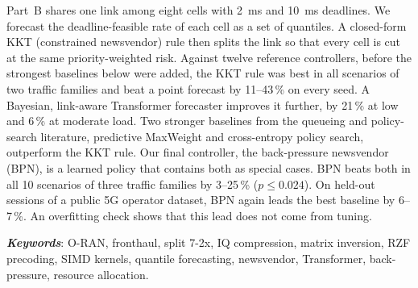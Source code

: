 \documentclass[12pt,a4paper,oneside]{report}
\theoremstyle{definition}
\begin{document}
Part~B shares one link among eight cells with 2~ms and 10~ms deadlines. We forecast the deadline-feasible rate of each cell as a set of quantiles. A closed-form KKT (constrained newsvendor) rule then splits the link so that every cell is cut at the same priority-weighted risk. Against twelve reference controllers, before the strongest baselines below were added, the KKT rule was best in all scenarios of two traffic families and beat a point forecast by 11--43\,\% on every seed. A Bayesian, link-aware Transformer forecaster improves it further, by 21\,\% at low and 6\,\% at moderate load. Two stronger baselines from the queueing and policy-search literature, predictive MaxWeight and cross-entropy policy search, outperform the KKT rule. Our final controller, the back-pressure newsvendor (BPN), is a learned policy that contains both as special cases. BPN beats both in all 10 scenarios of three traffic families by 3--25\,\% ($p \le 0.024$). On held-out sessions of a public 5G operator dataset, BPN again leads the best baseline by 6--7\,\%. An overfitting check shows that this lead does not come from tuning.

\vspace{2mm}
\noindent\textbf{\emph{Keywords}}: O-RAN, fronthaul, split 7-2x, IQ compression, matrix inversion, RZF precoding, SIMD kernels, quantile forecasting, newsvendor, Transformer, back-pressure, resource allocation.

\tableofcontents
\listoffigures
{}
\listoftables
{}

\end{document}
